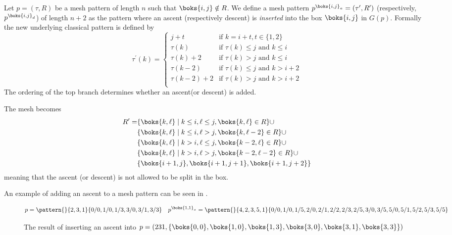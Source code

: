 \begin{definition}
Let \(p=(\tau,R)\) be a mesh pattern of length \(n\) such that
\(\boks{i,j}\notin R\). We define a mesh pattern \(p^{\boks{i,j}_a} =
(\tau^\prime,R^\prime)\) (respectively, \(p^{\boks{i,j}_d}\)) of length \(n+2\) as the pattern
where an ascent (respectively descent) is \emph{inserted} into the box \(\boks{i,j}\) in
\(G(p)\). Formally the new underlying classical pattern is defined by
\begin{equation*}
\tau^\prime(k) = \begin{cases}
    j+t & \text{if } k = i+t,t\in\{1,2\}\\
    \tau(k) & \text{if } \tau(k)\le j \text{ and }k\le i\\
    \tau(k)+2 & \text{if } \tau(k)> j \text{ and }k\le i\\
    \tau(k-2) & \text{if } \tau(k)\le j \text{ and }k> i+2\\
    \tau(k-2)+2 & \text{if } \tau(k)> j \text{ and }k> i+2\\
\end{cases}
\end{equation*}
The ordering of the top branch determines whether an ascent(or descent) is added.

The mesh becomes
\begin{equation*}
\begin{aligned}
R^\prime=&\{\boks{k,\ell}\mid k\le i, \ell\le j, \boks{k,\ell}\in R\} \cup\\
&\{\boks{k,\ell}\mid k\le i, \ell > j, \boks{k,\ell-2}\in R\}\cup\\
&\{\boks{k,\ell}\mid k > i, \ell \le j, \boks{k-2,\ell}\in R\}\cup\\
&\{\boks{k,\ell}\mid k > i, \ell > j, \boks{k-2,\ell-2}\in R\}\cup\\
&\{\boks{i+1,j},\boks{i+1,j+1},\boks{i+1,j+2}\}
\end{aligned}
\end{equation*}
meaning that the ascent (or descent) is not allowed to be split in the box.
\end{definition}
An example of adding an ascent to a mesh pattern can be seen in .
\begin{figure}
\begin{equation*}
p = \pattern{}{2,3,1}{0/0,1/0,1/3,
                      3/0,3/1,3/3} \quad
p^{\boks{1,1}_a}= \pattern{}{4,2,3,5,1}{0/0,
                        1/0,1/5,
                        2/0,2/1,2/2,2/3,2/5,
                        3/0,3/5,
                        5/0,5/1,5/2,5/3,5/5}
\end{equation*}
\caption{The result of inserting an ascent into
\(p=(231,\{\boks{0,0},\boks{1,0},\boks{1,3},\boks{3,0},\boks{3,1},\boks{3,3}\})\)}
\label{fig:adda}
\end{figure}

